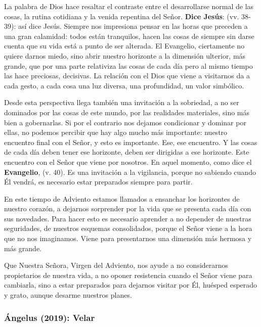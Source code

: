 La palabra de Dios hace resaltar el contraste entre el desarrollarse normal de las cosas, la rutina cotidiana y la venida repentina del Señor. \textbf{Dice Jesús}:  (vv. 38-39): así dice Jesús. Siempre nos impresiona pensar en las horas que preceden a una gran calamidad: todos están tranquilos, hacen las cosas de siempre sin darse cuenta que su vida está a punto de ser alterada. El Evangelio, ciertamente no quiere darnos miedo, sino abrir nuestro horizonte a la dimensión ulterior, más grande, que por una parte relativiza las cosas de cada día pero al mismo tiempo las hace preciosas, decisivas. La relación con el Dios que viene a visitarnos da a cada gesto, a cada cosa una luz diversa, una profundidad, un valor simbólico.

Desde esta perspectiva llega también una invitación a la sobriedad, a no ser dominados por las cosas de este mundo, por las realidades materiales, sino más bien a gobernarlas. Si por el contrario nos dejamos condicionar y dominar por ellas, no podemos percibir que hay algo mucho más importante: nuestro encuentro final con el Señor, y esto es importante. Ese, ese encuentro. Y las cosas de cada día deben tener ese horizonte, deben ser dirigidas a ese horizonte. Este encuentro con el Señor que viene por nosotros. En aquel momento, como dice el \textbf{Evangelio},  (v. 40). Es una invitación a la vigilancia, porque no sabiendo cuando Él vendrá, es necesario estar preparados siempre para partir.

En este tiempo de Adviento estamos llamados a ensanchar los horizontes de nuestro corazón, a dejarnos sorprender por la vida que se presenta cada día con sus novedades. Para hacer esto es necesario aprender a no depender de nuestras seguridades, de nuestros esquemas consolidados, porque el Señor viene a la hora que no nos imaginamos. Viene para presentarnos una dimensión más hermosa y más grande.

Que Nuestra Señora, Virgen del Adviento, nos ayude a no considerarnos propietarios de nuestra vida, a no oponer resistencia cuando el Señor viene para cambiarla, sino a estar preparados para dejarnos visitar por Él, huésped esperado y grato, aunque desarme nuestros planes.

\subsubsection{Ángelus (2019): Velar}

